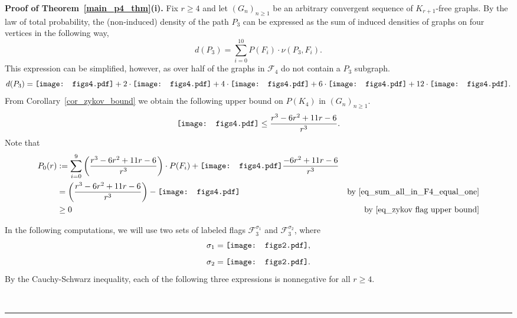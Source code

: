 \documentclass[12pt]{article}
\renewenvironment{proof}[1][Proof]{\textbf{#1.} }{\ \rule{0.5em}{0.5em}}
\newcommand{\vc}[1]{\ensuremath{\vcenter{\hbox{#1}}}}
\newcommand{\ftwa}{\vc{\texttt{[image: figs2.pdf]}}}
\newcommand{\ftwb}{\vc{\texttt{[image: figs2.pdf]}}}
\newcommand{\ffre}{\vc{\texttt{[image: figs4.pdf]}}}
\newcommand{\ffrf}{\vc{\texttt{[image: figs4.pdf]}}}
\newcommand{\ffrg}{\vc{\texttt{[image: figs4.pdf]}}}
\newcommand{\ffrh}{\vc{\texttt{[image: figs4.pdf]}}}
\newcommand{\ffri}{\vc{\texttt{[image: figs4.pdf]}}}
\begin{document}
\begin{proof}[Proof of Theorem~\ref{main_p4_thm}(i)]
Fix $r \geq 4$ and let $(G_n)_{n \geq 1}$ be an arbitrary convergent sequence of $K_{r+1}$-free graphs. By the law of total probability, the (non-induced) density of the path $P_3$ can be expressed as the sum of induced densities of graphs on four vertices in the following way, 
\begin{equation}\label{eq_law_total_prob_dens_p3}
d(P_3) = \sum\limits_{i = 0}^{10} P(F_i)\cdot\nu(P_3, F_i).\end{equation}
This expression can be simplified, however, as over half of the graphs in $\mathcal{F}_4$ do not contain a $P_3$ subgraph.
\begin{equation*}
 d(P_3) = \ffrf + 2 \cdot \ffre + 4 \cdot \ffrg + 6 \cdot \ffrh + 12 \cdot \ffri.
\end{equation*}
From Corollary~\ref{cor_zykov_bound} we obtain the following upper bound on $P(K_4)$ in $(G_n)_{n \geq 1}$. 
\begin{equation}\label{eq_zykov flag upper bound}
\ffri \leq \frac{r^3 - 6r^2 + 11r - 6}{r^3}.
\end{equation}
Note that
\begin{align*}
P_0(r) &:= \sum\limits_{i = 0}^{9} \left(\frac{r^3 - 6r^2 + 11r -
6}{r^3}\right) \cdot P(F_i) + \ffri\frac{-6r^2 + 11r - 6}{r^3}\\
	&=  \left(\frac{r^3 - 6r^2 + 11r -
6}{r^3}\right) - \ffri & \text{by \eqref{eq_sum_all_in_F4_equal_one}}\\
	&\ge 0 & \text{by \eqref{eq_zykov flag upper bound}}
\end{align*}

In the following computations, we will use two sets of labeled flags $\mathcal{F}_3^{\sigma_1}$ and $\mathcal{F}_3^{\sigma_2}$, where  
\[ \sigma_1 = \ftwa, \]  
\[\sigma_2 = \ftwb. \]
By the Cauchy-Schwarz inequality, each of the following three expressions is nonnegative for all $r \geq 4$.  


\end{proof}
\end{document}
